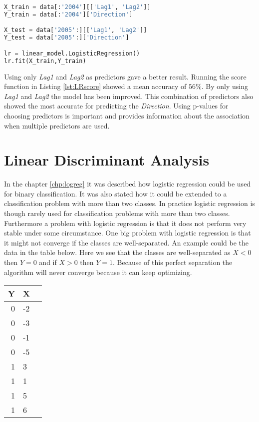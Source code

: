 \begin{lstlisting}[language=Python, label=lst:OnlyLag1Lag2, caption=Logistic regression using only Lag1 and Lag2 as predictors]
X_train = data[:'2004'][['Lag1', 'Lag2']]
Y_train = data[:'2004']['Direction']

X_test = data['2005':][['Lag1', 'Lag2']]
Y_test = data['2005':]['Direction']

lr = linear_model.LogisticRegression()
lr.fit(X_train,Y_train)
\end{lstlisting}

Using only \emph{Lag1} and \emph{Lag2} as predictors gave a better result. Running the score function in Listing \ref{lst:LRscore} showed a mean accuracy of $56\%$. By only using \emph{Lag1} and \emph{Lag2} the model has been improved. This combination of predictors also showed the most accurate for predicting the \emph{Direction}. Using p-values for choosing predictors is important and provides information about the association when multiple predictors  are used.



\section{Linear Discriminant Analysis}
\label{chp:lindisana}

In the chapter \ref{chp:logreg} it was described how logistic regression could be used for binary classification. It was also stated how it could be extended to  a classification problem with more than two classes. In practice logistic regression is though rarely used for classification problems with more than two classes. Furthermore a problem with logistic regression is that it does not perform very stable under some circumstance. One big problem with logistic regression is that it might not converge if the classes are well-separated. An example could be the data in the table below. Here we see that the classes are well-separated as $X<0$ then $Y=0$ and if $X>0$ then $Y=1$. Because of this perfect separation the algorithm will never converge because it can keep optimizing.
\begin{center} 
	\begin{tabular}{rll}
		\multicolumn{1}{c}{\textbf{Y}} &
		\multicolumn{1}{c}{\textbf{X}} \\ \hline
		0     &  -2  \\[0.05cm] 
		0     &  -3  \\[0.05cm] 
		0     &  -1  \\[0.05cm] 
		0     &  -5  \\[0.05cm] 
		1     &    3  \\[0.05cm] 
		1     &    1  \\[0.05cm] 
		1     &    5  \\[0.05cm] 
		1     &    6  \\[0.05cm] 
	\end{tabular}
\end{center}

